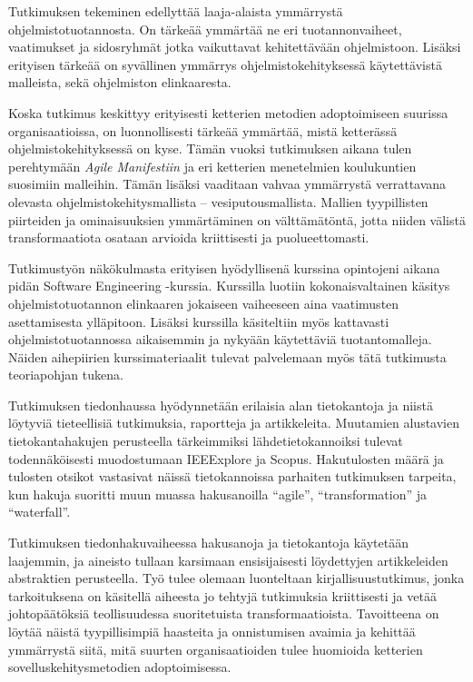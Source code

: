 Tutkimuksen tekeminen edellyttää laaja-alaista ymmärrystä
ohjelmistotuotannosta. On tärkeää ymmärtää ne eri
tuotannonvaiheet, vaatimukset ja sidosryhmät jotka vaikuttavat
kehitettävään ohjelmistoon. Lisäksi erityisen tärkeää on
syvällinen ymmärrys ohjelmistokehityksessä käytettävistä
malleista, sekä ohjelmiston elinkaaresta.

Koska tutkimus keskittyy erityisesti ketterien metodien adoptoimiseen
suurissa organisaatioissa, on luonnollisesti tärkeää ymmärtää,
mistä ketterässä ohjelmistokehityksessä on kyse. Tämän vuoksi
tutkimuksen aikana tulen perehtymään \textit{Agile Manifestiin}
ja eri ketterien menetelmien koulukuntien suosimiin malleihin.
Tämän lisäksi vaaditaan vahvaa ymmärrystä verrattavana olevasta
ohjelmistokehitysmallista – vesiputousmallista. Mallien tyypillisten
piirteiden ja ominaisuuksien ymmärtäminen on välttämätöntä, jotta
niiden välistä transformaatiota osataan arvioida kriittisesti ja
puolueettomasti.

Tutkimustyön näkökulmasta erityisen hyödyllisenä kurssina
opintojeni aikana pidän Software Engineering -kurssia. Kurssilla
luotiin kokonaisvaltainen käsitys ohjelmistotuotannon elinkaaren
jokaiseen vaiheeseen aina vaatimusten asettamisesta ylläpitoon.
Lisäksi kurssilla käsiteltiin myös kattavasti ohjelmistotuotannossa
aikaisemmin ja nykyään käytettäviä tuotantomalleja. Näiden
aihepiirien kurssimateriaalit tulevat palvelemaan myös tätä
tutkimusta teoriapohjan tukena.

Tutkimuksen tiedonhaussa hyödynnetään erilaisia alan tietokantoja
ja niistä löytyviä tieteellisiä tutkimuksia, raportteja ja
artikkeleita. Muutamien alustavien tietokantahakujen perusteella
tärkeimmiksi lähdetietokannoiksi tulevat todennäköisesti
muodostumaan IEEExplore ja Scopus. Hakutulosten määrä ja tulosten
otsikot vastasivat näissä tietokannoissa parhaiten tutkimuksen
tarpeita, kun hakuja suoritti muun muassa hakusanoilla ``agile'',
``transformation'' ja ``waterfall''.

Tutkimuksen tiedonhakuvaiheessa hakusanoja ja tietokantoja käytetään
laajemmin, ja aineisto tullaan karsimaan ensisijaisesti löydettyjen
artikkeleiden abstraktien perusteella. Työ tulee olemaan luonteltaan
kirjallisuustutkimus, jonka tarkoituksena on käsitellä aiheesta
jo tehtyjä tutkimuksia kriittisesti ja vetää johtopäätöksiä
teollisuudessa suoritetuista transformaatioista. Tavoitteena on
löytää näistä tyypillisimpiä haasteita ja onnistumisen avaimia ja
kehittää ymmärrystä siitä, mitä suurten organisaatioiden tulee
huomioida ketterien sovelluskehitysmetodien adoptoimisessa.
